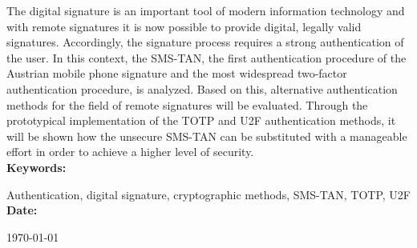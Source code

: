 The digital signature is an important tool of modern information technology and with remote signatures it is now possible to provide digital, legally valid signatures. Accordingly, the signature process requires a strong authentication of the user. In this context, the SMS-TAN, the first authentication procedure of the Austrian mobile phone signature and the most widespread two-factor authentication procedure, is analyzed. Based on this, alternative authentication methods for the field of remote signatures will be evaluated. Through the prototypical implementation of the TOTP and U2F authentication methods, it will be shown how the unsecure SMS-TAN can be substituted with a manageable effort in order to achieve a higher level of security.
\\[4ex]
\textbf{Keywords:}

Authentication, digital signature, cryptographic methods, SMS-TAN, TOTP, U2F
\\[4ex]
\textbf{Date:}

\today
\clearpage